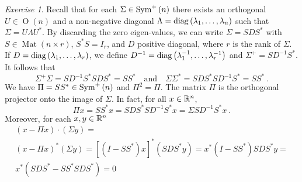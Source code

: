 \documentclass[12pt,a4paper]{amsart}
\newcommand{\MRof}[2]{\operatorname{Mat}\left(#1\times#2\right)}
\newcommand{\Oof}[1]{\operatorname{O}(#1)}
\theoremstyle{plain}%
\theoremstyle{definition}
\theoremstyle{remark}
\newtheorem{exercise}{Exercise}
\begin{document}
\begin{exercise}
  Recall that for each $\Sigma \in \operatorname{Sym}^{+}\left(n\right)$ there exists an orthogonal $U \in \Oof n$ and a non-negative diagonal $\Lambda = \operatorname{diag}\left(\lambda_1,\dots,\lambda_n\right)$ such that $\Sigma = U \Lambda U^*$. By discarding the zero eigen-values, we can write $\Sigma = S D S^*$ with $S \in \MRof n r$, $S^*S = I_r$, and $D$ positive diagonal, where $r$ is the rank of $\Sigma$. If $D = \operatorname{diag}\left(\lambda_1,\dots,\lambda_r\right)$, we define $D^{-1} = \operatorname{diag}\left(\lambda_1^{-1},\dots,\lambda_r^{-1}\right)$ and $\Sigma^+ = S D^{-1} S^*$. It follows that
  \begin{equation*}
\Sigma^+ \Sigma = S D^{-1} S^* S D S^* = SS^* \quad\text{and}\quad  \Sigma\Sigma^* = S D S^* S D^{-1} S^* =SS^* \ .
  \end{equation*}
We have $\Pi = SS^* \in \operatorname{Sym}^{+}\left(n\right)$ and $\Pi^2 = \Pi$. The matrix $\Pi$ is the orthogonal projector onto the image of $\Sigma$. In fact, for all $x \in \mathbb{R}^n$,
\begin{equation*}
\Pi x = SS^* x =  SDS^*SD^{-1}S^* x = \Sigma SD^{-1}S^* x \ .  
\end{equation*}
Moreover, for each $x,y \in \mathbb{R}^n$
\begin{multline*}
(x - \Pi x) \cdot (\Sigma y) =  \\ (x - \Pi x)^* (\Sigma y) = [(I - SS^*)x]^*(SDS^*y) = x^* (I-SS^*)SDS^* y = \\ x^*(SDS^* - SS^*SDS^*) =  0    
\end{multline*}
\end{exercise}
\end{document}
